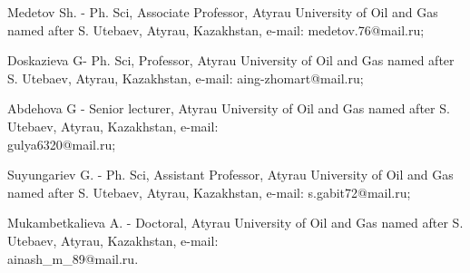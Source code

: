 \begin{authorinfo}
Medetov Sh. - Ph. Sci, Associate Professor, Atyrau University of Oil and
Gas named after S. Utebaev, Atyrau, Kazakhstan, e-mail: medetov.76@mail.ru;

Doskazieva G- Ph. Sci, Professor, Atyrau University of Oil and Gas named
after S. Utebaev, Atyrau, Kazakhstan, e-mail: aing-zhomart@mail.ru;

Abdehova G - Senior lecturer, Atyrau University of Oil and Gas
named after S. Utebaev, Atyrau, Kazakhstan, e-mail:\\
gulya6320@mail.ru;

Suyungariev G. - Ph. Sci, Assistant Professor, Atyrau
University of Oil and Gas named after S. Utebaev, Atyrau, Kazakhstan,
e-mail: s.gabit72@mail.ru;

Mukambetkalieva A. - Doctoral, Atyrau University of Oil and Gas named
after S. Utebaev, Atyrau, Kazakhstan, e-mail: \\ainash\_m\_89@mail.ru.
\end{authorinfo}
